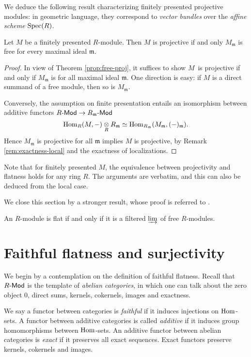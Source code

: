 We deduce the following result characterizing finitely presented projective modules: in geometric language, they correspond to \emph{vector bundles} over the \emph{affine scheme} $\operatorname{Spec}(R)$.
\begin{corollary}
	Let $M$ be a finitely presented $R$-module. Then $M$ is projective if and only $M_{\mathfrak{m}}$ is free for every maximal ideal $\mathfrak{m}$.
\end{corollary}
\begin{proof}
	In view of Theorem \ref{prop:free-proj}, it suffices to show $M$~is projective if and only if $M_{\mathfrak{m}}$ is for all maximal ideal $\mathfrak{m}$. One direction is easy: if $M$ is a direct summand of a free module, then so is $M_{\mathfrak{m}}$.

	Conversely, the assumption on finite presentation entails an isomorphism between additive functors $R\text{-}\mathsf{Mod} \to R_{\mathfrak{m}}\text{-}\mathsf{Mod}$
	\[ \operatorname{Hom}_R(M, -) \underset{R}{\otimes} R_{\mathfrak{m}} \simeq \operatorname{Hom}_{R_{\mathfrak{m}}}(M_{\mathfrak{m}}, (-)_{\mathfrak{m}}). \]
	Hence $M_{\mathfrak{m}}$ is projective for all $\mathfrak{m}$ implies $M$ is projective, by Remark \ref{rem:exactness-local} and the exactness of localizations.
\end{proof}

Note that for finitely presented $M$, the equivalence between projectivity and flatness holds for any ring $R$. The arguments are verbatim, and this can also be deduced from the local case.

We close this section by a stronger result, whose proof is referred to \cite[Theorem A6.6]{Eis95}.
\begin{theorem}
	An $R$-module is flat if and only if it is a filtered $\varinjlim$ of free $R$-modules.
\end{theorem}

\section{Faithful flatness and surjectivity}
We begin by a contemplation on the definition of faithful flatness. Recall that $R\text{-}\mathsf{Mod}$ is the template of \emph{abelian categories}, in which one can talk about the zero object $0$, direct sums, kernels, cokernels, images and exactness.

We say a functor between categories is \emph{faithful} if it induces injections on $\operatorname{Hom}$-sets. A functor between additive categories is called \emph{additive} if it induces group homomorphisms between $\operatorname{Hom}$-sets. An additive functor between abelian categories is \emph{exact} if it preserves all exact sequences. Exact functors preserve kernels, cokernels and images.

